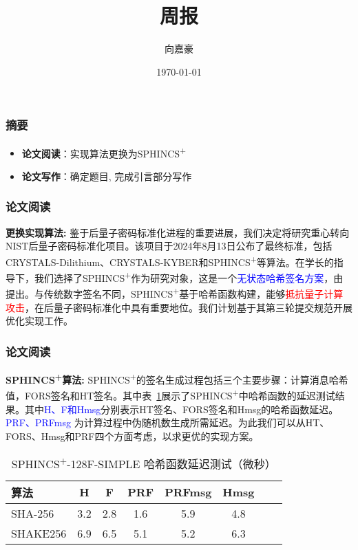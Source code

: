\documentclass{beamer}
\title{周报}
\author{向嘉豪}
\institute{衡阳师范学院}
\date{\today}
\begin{document}
\begin{frame}
  \titlepage
\end{frame}

\begin{frame}
  \frametitle{摘要}
  \begin{itemize}
    \item \textbf{论文阅读}：实现算法更换为SPHINCS\textsuperscript{+}
    \item \textbf{论文写作}：确定题目, 完成引言部分写作
  \end{itemize}
\end{frame}

\begin{frame}
  \frametitle{论文阅读}
  \noindent \textbf{更换实现算法: } 鉴于后量子密码标准化进程的重要进展，我们决定将研究重心转向NIST后量子密码标准化项目。该项目于2024年8月13日公布了最终标准，包括CRYSTALS-Dilithium、CRYSTALS-KYBER和SPHINCS\textsuperscript{+}等算法。在学长的指导下，我们选择了SPHINCS\textsuperscript{+}作为研究对象，这是一个\textcolor{blue}{无状态哈希签名方案}，由\cite{Bernstein2019}提出。与传统数字签名不同，SPHINCS\textsuperscript{+}基于哈希函数构建，能够\textcolor{red}{抵抗量子计算攻击}，在后量子密码标准化中具有重要地位。我们计划基于其第三轮提交规范开展优化实现工作。

\end{frame}

\begin{frame}
  \frametitle{论文阅读}

  \noindent \textbf{SPHINCS\textsuperscript{+}算法: } SPHINCS\textsuperscript{+}的签名生成过程包括三个主要步骤：计算消息哈希值，FORS签名和HT签名。其中表~\ref{tab:hash_latency}展示了SPHINCS\textsuperscript{+}中哈希函数的延迟测试结果。其中\textcolor{blue}{H、F和Hmsg}分别表示HT签名、FORS签名和Hmsg的哈希函数延迟。\textcolor{blue}{PRF、PRFmsg} 为计算过程中伪随机数生成所需延迟。为此我们可以从HT、FORS、Hmsg和PRF四个方面考虑，以求更优的实现方案。

  \begin{table}[htbp]
    \centering
    \caption{SPHINCS\textsuperscript{+}-128F-SIMPLE 哈希函数延迟测试（微秒）\cite{Wang2025}}
    \label{tab:hash_latency}
    \begin{tabular}{lccccccc}
      \toprule
      算法 & H & F & PRF & PRFmsg & Hmsg \\
      \midrule
      SHA-256  & 3.2 & 2.8 & 1.6 & 5.9 & 4.8 \\
      SHAKE256  & 6.9 & 6.5 & 5.1 & 5.2 & 6.3 \\
      \bottomrule
    \end{tabular}
  \end{table}
\end{frame}
\end{document}
